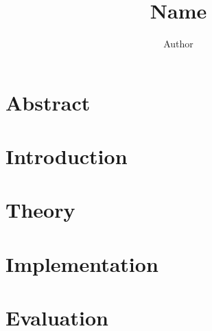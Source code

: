 \documentclass[a4paper]{article}
\author{Author}
\title{Name}
\begin{document}
\maketitle

\section*{Abstract}
\lipsum[1]

\section{Introduction}
\lipsum[2]

\section{Theory}
\lipsum[3]

\section{Implementation}
\lipsum[4]

\section{Evaluation}
\lipsum[5]
\end{document}
